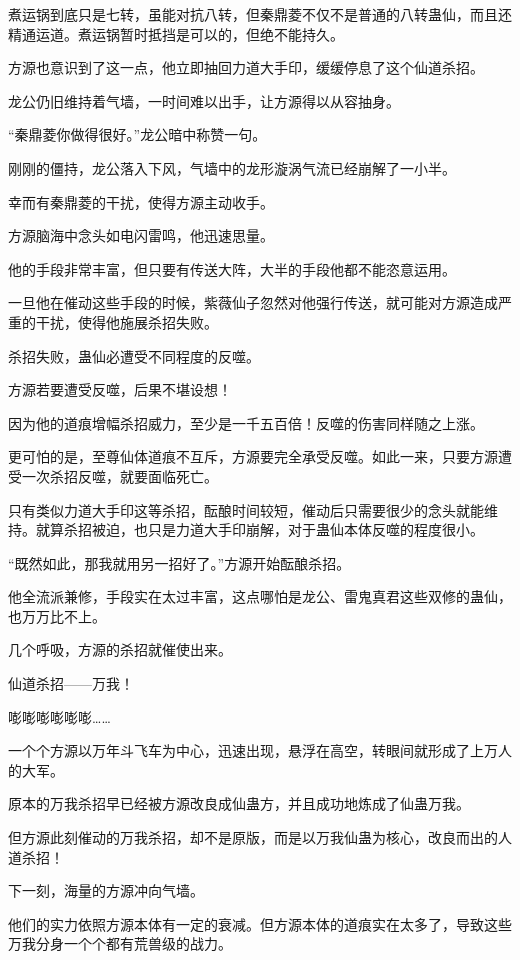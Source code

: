 \begin{this_body}
煮运锅到底只是七转，虽能对抗八转，但秦鼎菱不仅不是普通的八转蛊仙，而且还精通运道。煮运锅暂时抵挡是可以的，但绝不能持久。

方源也意识到了这一点，他立即抽回力道大手印，缓缓停息了这个仙道杀招。

龙公仍旧维持着气墙，一时间难以出手，让方源得以从容抽身。

“秦鼎菱你做得很好。”龙公暗中称赞一句。

刚刚的僵持，龙公落入下风，气墙中的龙形漩涡气流已经崩解了一小半。

幸而有秦鼎菱的干扰，使得方源主动收手。

方源脑海中念头如电闪雷鸣，他迅速思量。

他的手段非常丰富，但只要有传送大阵，大半的手段他都不能恣意运用。

一旦他在催动这些手段的时候，紫薇仙子忽然对他强行传送，就可能对方源造成严重的干扰，使得他施展杀招失败。

杀招失败，蛊仙必遭受不同程度的反噬。

方源若要遭受反噬，后果不堪设想！

因为他的道痕增幅杀招威力，至少是一千五百倍！反噬的伤害同样随之上涨。

更可怕的是，至尊仙体道痕不互斥，方源要完全承受反噬。如此一来，只要方源遭受一次杀招反噬，就要面临死亡。

只有类似力道大手印这等杀招，酝酿时间较短，催动后只需要很少的念头就能维持。就算杀招被迫，也只是力道大手印崩解，对于蛊仙本体反噬的程度很小。

“既然如此，那我就用另一招好了。”方源开始酝酿杀招。

他全流派兼修，手段实在太过丰富，这点哪怕是龙公、雷鬼真君这些双修的蛊仙，也万万比不上。

几个呼吸，方源的杀招就催使出来。

仙道杀招——万我！

嘭嘭嘭嘭嘭嘭……

一个个方源以万年斗飞车为中心，迅速出现，悬浮在高空，转眼间就形成了上万人的大军。

原本的万我杀招早已经被方源改良成仙蛊方，并且成功地炼成了仙蛊万我。

但方源此刻催动的万我杀招，却不是原版，而是以万我仙蛊为核心，改良而出的人道杀招！

下一刻，海量的方源冲向气墙。

他们的实力依照方源本体有一定的衰减。但方源本体的道痕实在太多了，导致这些万我分身一个个都有荒兽级的战力。


\end{this_body}
